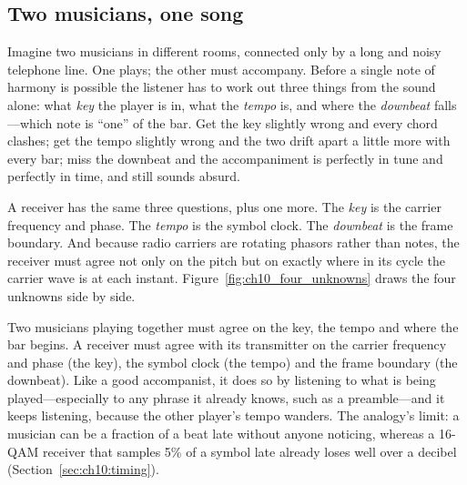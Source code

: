 \subsection{Two musicians, one song}

Imagine two musicians in different rooms, connected only by a long and noisy telephone line.
One plays; the other must accompany. Before a single note of harmony is possible the listener
has to work out three things from the sound alone: what \emph{key} the player is in, what the
\emph{tempo} is, and where the \emph{downbeat} falls---which note is ``one'' of the bar. Get the
key slightly wrong and every chord clashes; get the tempo slightly wrong and the two drift apart
a little more with every bar; miss the downbeat and the accompaniment is perfectly in tune and
perfectly in time, and still sounds absurd.

A receiver has the same three questions, plus one more. The \emph{key} is the carrier frequency
and phase. The \emph{tempo} is the symbol clock. The \emph{downbeat} is the frame boundary.
And because radio carriers are rotating phasors rather than notes, the receiver must agree not
only on the pitch but on exactly where in its cycle the carrier wave is at each instant.
Figure~\ref{fig:ch10_four_unknowns} draws the four unknowns side by side.


\begin{analogy}
Two musicians playing together must agree on the key, the tempo and where the bar begins. A
receiver must agree with its transmitter on the carrier frequency and phase (the key), the
symbol clock (the tempo) and the frame boundary (the downbeat). Like a good accompanist, it
does so by listening to what is being played---especially to any phrase it already knows,
such as a preamble---and it keeps listening, because the other player's tempo wanders. The
analogy's limit: a musician can be a fraction of a beat late without anyone noticing, whereas a
16-QAM receiver that samples 5\% of a symbol late already loses well over a decibel
(Section~\ref{sec:ch10:timing}).
\end{analogy}

